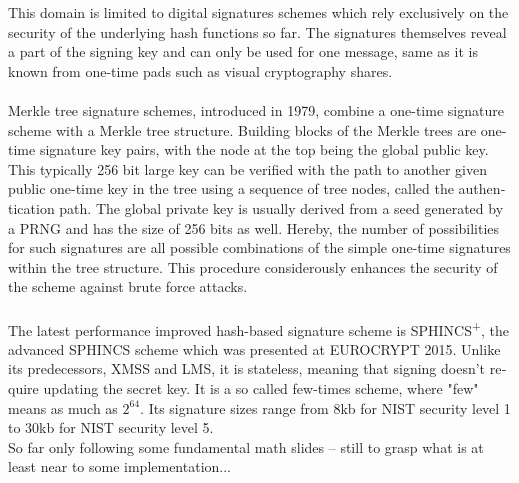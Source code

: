 \documentclass[a4paper,11pt,draft]{article}
\begin{document}
\begin{otherlanguage}{english}
\begin{multicols}{2}
This domain is limited to digital signatures schemes which rely exclusively on the security of the underlying hash functions so far. The signatures themselves reveal a part of the signing key and can only be used for one message, same as it is known from one-time pads such as visual cryptography shares. \\
\\
Merkle tree signature schemes, introduced in 1979, combine a one-time signature scheme with a Merkle tree structure. Building blocks of the Merkle trees are one-time signature key pairs, with the node at the top being the global public key. This typically 256 bit large key can be verified with the path to another given public one-time key in the tree using a sequence of tree nodes, called the authentication path. The global private key is usually derived from a seed generated by a PRNG and has the size of 256 bits as well.
Hereby, the number of possibilities for such signatures are all possible combinations of the simple one-time signatures within the tree structure. This procedure considerously enhances the security of the scheme against brute force attacks. \\
\\
The latest performance improved hash-based signature scheme is SPHINCS\textsuperscript{+}, the advanced SPHINCS scheme which was presented at EUROCRYPT 2015. Unlike its predecessors, XMSS and LMS, it is stateless, meaning that signing doesn't require updating the secret key. It is a so called few-times scheme, where "few" means as much as $2^{64}$. Its signature sizes range from 8kb for NIST security level 1 to 30kb for NIST security level 5.\\

 So far only following some fundamental math slides -- still to grasp what is at least near to some implementation...


\end{multicols}
\end{otherlanguage}
\end{document}
